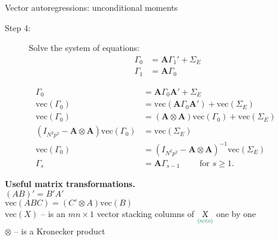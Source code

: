 \documentclass[notes,blackandwhite,mathsans,usenames,dvipsnames]{beamer}
\begin{document}
\begin{frame}{Vector autoregressions: unconditional moments }
\small
\begin{description}
\item[Step 4:] {\color{mcxs1}Solve} {\color{mcxs2}the system of equations}:
\begin{align*}
\Gamma_0 &= \mathbf{A}\Gamma_1' + \Sigma_E\\
\Gamma_1 &= \mathbf{A}\Gamma_0
\end{align*}
\end{description}
\begin{align*}
\Gamma_0 &= \mathbf{A}\Gamma_0\mathbf{A}' + \Sigma_E\\
\text{vec}(\Gamma_0) &= \text{vec}(\mathbf{A}\Gamma_0\mathbf{A}') + \text{vec}(\Sigma_E)\\
\text{vec}(\Gamma_0) &= (\mathbf{A}\otimes\mathbf{A})\text{vec}(\Gamma_0) + \text{vec}(\Sigma_E)\\
(I_{N^2p^2} - \mathbf{A}\otimes\mathbf{A})\text{vec}(\Gamma_0) &= \text{vec}(\Sigma_E)\\
\text{vec}(\Gamma_0) &= (I_{N^2p^2} - \mathbf{A}\otimes\mathbf{A})^{-1}\text{vec}(\Sigma_E)\\[1ex]
\Gamma_s &= \mathbf{A}\Gamma_{s-1} \qquad\text{ for }s\geq1.
\end{align*}

\textbf{Useful matrix transformations.}\\
$(AB)' = B'A' $\\
$\text{vec}(ABC) = (C'\otimes A)\text{vec}(B)$\\
$\text{vec}(X)$ {\color{mcxs2}-- is an} $mn\times1$ {\color{mcxs2}vector stacking columns of} $\underset{\color{mcxs2}(m\times n)}{X}$ {\color{mcxs2}one by one}\\
$\otimes$ {\color{mcxs2}-- is a Kronecker product}

\end{frame}
\end{document}
